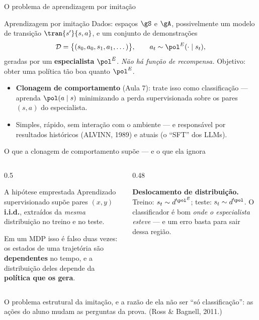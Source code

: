 \documentclass[aspectratio=169, 11pt]{beamer}
\newcommand{\polE}{\pol^{E}}                     %
\newcommand{\Dset}{\mathcal{D}}
\begin{document}
\begin{frame}{O problema de aprendizagem por imitação}

  \begin{defbox}{Aprendizagem por imitação}
    Dados: espaços $\gS$ e $\gA$, possivelmente um modelo de transição
    $\tran{s'}{s,a}$, e um conjunto de demonstrações
    \[
      \Dset = \bigl\{(s_0, a_0, s_1, a_1, \dots)\bigr\},
      \qquad a_t \sim \polE(\cdot \mid s_t),
    \]
    geradas por um \textbf{especialista} $\polE$. \emph{Não há função de
    recompensa.} Objetivo: obter uma política tão boa quanto $\polE$.
  \end{defbox}

  \begin{itemize}\setlength{\itemsep}{0.3ex}
    \item \textbf{Clonagem de comportamento} (Aula 7): trate isso como
      classificação --- aprenda $\pol(a\mid s)$ minimizando a perda
      supervisionada sobre os pares $(s,a)$ do especialista.
    \item Simples, rápido, sem interação com o ambiente --- e responsável por
      resultados históricos (ALVINN, 1989) e atuais (o ``SFT'' dos LLMs).
  \end{itemize}
\end{frame}

\begin{frame}{O que a clonagem de comportamento supõe --- e o que ela ignora}

  \begin{columns}[T]
  \begin{column}{0.5\textwidth}
    \begin{defbox}{A hipótese emprestada}
      Aprendizado supervisionado supõe pares $(x,y)$ \textbf{i.i.d.},
      extraídos da \emph{mesma} distribuição no treino e no teste.
    \end{defbox}
    \smallskip
    Em um MDP isso é falso duas vezes: os estados de uma trajetória são
    \textbf{dependentes} no tempo, e a distribuição deles depende da
    \textbf{política que os gera}.
  \end{column}
  \begin{column}{0.48\textwidth}
    \begin{alertabox}
      \textbf{Deslocamento de distribuição.} Treino: $s_t \sim d^{\polE}$;
      teste: $s_t \sim d^{\pol}$. O classificador é bom \emph{onde o
      especialista esteve} --- e um erro basta para sair dessa região.
    \end{alertabox}
  \end{column}
  \end{columns}

  \begin{ideiabox}
    O problema estrutural da imitação, e a razão de ela não ser ``só
    classificação'': as ações do aluno mudam as perguntas da prova.
    {\scriptsize\color{rlCinza}\;(Ross \& Bagnell, 2011.)}
  \end{ideiabox}
\end{frame}
\end{document}
